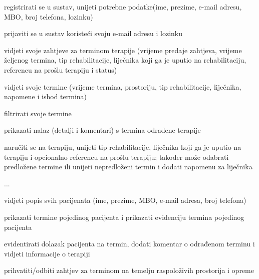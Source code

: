			
			\begin{packed_enum}
				\item  {}
				\begin{packed_enum}
					\item registrirati se u sustav, unijeti potrebne podatke(ime, prezime, e-mail adresu, MBO, broj telefona, lozinku)
				\end{packed_enum}
			
				\item  {}
				\begin{packed_enum}
					\item prijaviti se u sustav koristeći svoju e-mail adresu i lozinku
				\end{packed_enum}
				
				\item  {}
				\begin{packed_enum}
					\item vidjeti svoje zahtjeve za terminom terapije (vrijeme predaje zahtjeva, vrijeme željenog termina, tip rehabilitacije, liječnika koji ga je uputio na rehabilitaciju, referencu na prošlu terapiju i status) 
					\item vidjeti svoje termine (vrijeme termina, prostoriju, tip rehabilitacije, liječnika, napomene i ishod termina) 
					\item filtrirati svoje termine
					\item prikazati nalaz (detalji i komentari) s termina odrađene terapije
					\item naručiti se na terapiju, unijeti tip rehabilitacije, liječnika koji ga je uputio na terapiju i opcionalno referencu na prošlu terapiju; također može odabrati predložene termine ili unijeti nepredloženi termin i dodati napomenu za liječnika
					\item ...
				\end{packed_enum}
				
				\item  {}
				\begin{packed_enum}
					
					\item vidjeti popis svih pacijenata (ime, prezime, MBO, e-mail adresa, broj telefona)
					\item prikazati termine pojedinog pacijenta i prikazati evidenciju termina pojedinog pacijenta
					\item evidentirati dolazak pacijenta na termin, dodati komentar o odrađenom terminu i vidjeti informacije o terapiji
					\item prihvatiti/odbiti zahtjev za terminom na temelju raspoloživih prostorija i opreme 
					

\end{packed_enum}
\end{packed_enum}
